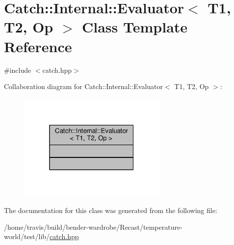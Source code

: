 \hypertarget{class_catch_1_1_internal_1_1_evaluator}{\section{Catch\-:\-:Internal\-:\-:Evaluator$<$ T1, T2, Op $>$ Class Template Reference}
\label{class_catch_1_1_internal_1_1_evaluator}
}


{\ttfamily \#include $<$catch.\-hpp$>$}



Collaboration diagram for Catch\-:\-:Internal\-:\-:Evaluator$<$ T1, T2, Op $>$\-:
\nopagebreak
\begin{figure}[H]
\begin{center}
\leavevmode
\includegraphics[width=208pt]{class_catch_1_1_internal_1_1_evaluator__coll__graph}
\end{center}
\end{figure}


The documentation for this class was generated from the following file\-:\begin{DoxyCompactItemize}
\item 
/home/travis/build/bender-\/wardrobe/\-Recast/temperature-\/world/test/lib/\hyperlink{catch_8hpp}{catch.\-hpp}\end{DoxyCompactItemize}
